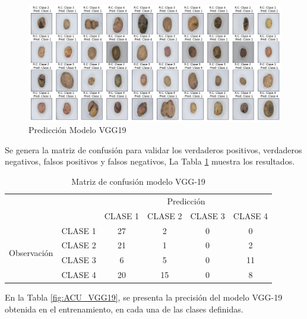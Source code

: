 			\begin{figure}[ht]
				\centering
				\includegraphics[scale=0.4]{Figs/103.png}
				\caption{Predicción Modelo VGG19}
				\label{fig:VGG19_prediccion}
			\end{figure}
		
			\newpage
			Se genera la matriz de confusión para validar los verdaderos positivos, verdaderos negativos, falsos positivos y falsos negativos, La Tabla \ref{fig:MC_VGG19} muestra los resultados.
			
						
			\begin{table}[htbp]
				\centering
				\begin{tabular}{|c|l|c|c|c|c|}
					\hline
					\multicolumn{2}{|c|}{\multirow{2}[4]{*}{}} & \multicolumn{4}{c|}{Predicción} \bigstrut\\
					\cline{3-6}    \multicolumn{2}{|c|}{} & CLASE 1 & CLASE 2 & CLASE 3 & CLASE 4 \bigstrut\\
					\hline
					\multirow{4}[8]{*}{\begin{sideways}Observación\end{sideways}} & CLASE 1 & 27     & 2     & 0    & 0 \bigstrut\\
					\cline{2-6}     & CLASE 2 & 21     & 1     & 0    & 2 \bigstrut\\
					\cline{2-6}      & CLASE 3 & 6     & 5     & 0    & 11 \bigstrut\\
					\cline{2-6}     & CLASE 4 & 20     & 15     & 0    & 8 \bigstrut\\
					\hline
				\end{tabular}%
				\caption{Matriz de confusión modelo VGG-19}
				\label{fig:MC_VGG19}
			\end{table}%

			En la Tabla \ref{fig:ACU_VGG19}, se presenta la precisión del modelo VGG-19 obtenida en el entrenamiento, en cada una de las clases definidas.
			
